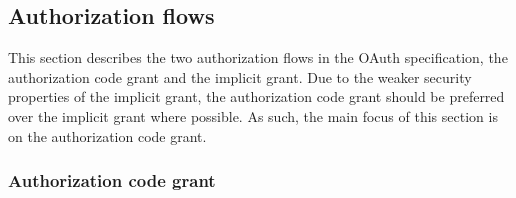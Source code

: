 \subsection{Authorization flows}
This section describes the two authorization flows in the OAuth specification, the authorization code grant and the implicit grant.
Due to the weaker security properties of the implicit grant, the authorization code grant should be preferred over the implicit grant where possible.
As such, the main focus of this section is on the authorization code grant.

\subsubsection{Authorization code grant}
\label{sec:background-oauth-code}

